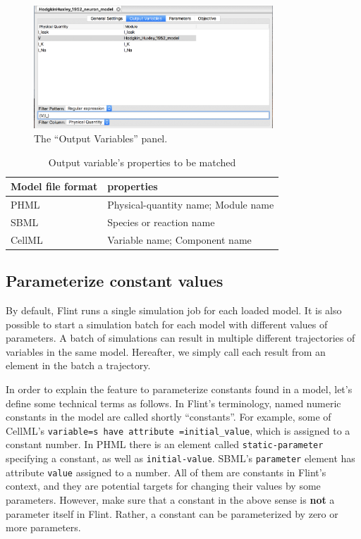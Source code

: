 \documentclass[a4paper,10pt]{report}
\begin{document}
\begin{figure}[htbp]
\centering
\includegraphics[width=0.8\textwidth]{image/lr-output-variables.png}
\caption{\label{fig:orga152034}The ``Output Variables'' panel.}
\end{figure}

\begin{table}[htbp]
\caption{\label{tab:orge4c894f}Output variable's properties to be matched}
\centering
\begin{tabular}{ll}
Model file format & properties\\
\hline
PHML & Physical-quantity name; Module name\\
SBML & Species or reaction name\\
CellML & Variable name; Component name\\
\end{tabular}
\end{table}

\subsection{Parameterize constant values}
\label{sec:orge1b2a85}
By default, Flint runs a single simulation job for each loaded model.
It is also possible to start a simulation batch for each model with
different values of parameters.
A batch of simulations can result in multiple different trajectories of
variables in the same model. Hereafter, we simply call each result from
an element in the batch a trajectory.

In order to explain the feature to parameterize constants found in a model,
let's define some technical terms as follows.
In Flint's terminology, named numeric constants in the model are called
shortly ``constants''.
For example, some of CellML's \texttt{variable=s have attribute
=initial\_value}, which is assigned to a constant number.
In PHML there is an element called \texttt{static-parameter} specifying a constant,
as well as \texttt{initial-value}.
SBML's \texttt{parameter} element has attribute \texttt{value} assigned to a number.
All of them are constants in Flint's context, and they are potential targets for
changing their values by some parameters.
However, make sure that a constant in the above sense is \textbf{not} a parameter
itself in Flint.
Rather, a constant can be parameterized by zero or more parameters.
\end{document}
